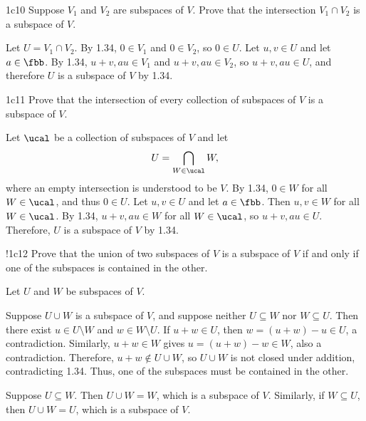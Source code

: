 \begin{exercise}{1c10}
    Suppose $V_1$ and $V_2$ are subspaces of $V$.
	Prove that the intersection $V_1 \cap V_2$ is a subspace of $V$.
\end{exercise}

\begin{sol}
    Let $U = V_1 \cap V_2$.
	By 1.34, $0 \in V_1$ and $0 \in V_2$, so $0 \in U$.
    Let $u, v \in U$ and let $a \in \fbb$.
    By 1.34, $u + v, au \in V_1$ and $u + v, au \in V_2$, so $u + v, au \in U$, and therefore $U$ is a subspace of $V$ by 1.34.
\end{sol}

\begin{exercise}{1c11}
    Prove that the intersection of every collection of subspaces of $V$ is a subspace of $V$.
\end{exercise}

\begin{sol}
    Let $\ucal$ be a collection of subspaces of $V$ and let
    \[
        U = \bigcap_{W \in \ucal} W,
    \]
    where an empty intersection is understood to be $V$.
    By 1.34, $0 \in W$ for all $W \in \ucal$, and thus $0 \in U$.
    Let $u, v \in U$ and let $a \in \fbb$.
    Then $u, v \in W$ for all $W \in \ucal$.
    By 1.34, $u + v, au \in W$ for all $W \in \ucal$, so $u + v, au \in U$.
    Therefore, $U$ is a subspace of $V$ by 1.34.
\end{sol}

\begin{exercise}!{1c12}
    Prove that the union of two subspaces of $V$ is a subspace of $V$ if and only if one of the subspaces is contained in the other.
\end{exercise}

\begin{sol}
    Let $U$ and $W$ be subspaces of $V$.

    \rightimp Suppose $U \cup W$ is a subspace of $V$, and suppose neither $U \subseteq W$ nor $W \subseteq U$.
    Then there exist $u \in U \setminus W$ and $w \in W \setminus U$.
	If $u + w \in U$, then $w = (u + w) - u \in U$, a contradiction.
    Similarly, $u + w \in W$ gives $u = (u + w) - w \in W$, also a contradiction.
    Therefore, $u + w \notin U \cup W$, so $U \cup W$ is not closed under addition, contradicting 1.34.
    Thus, one of the subspaces must be contained in the other.

    \leftimp Suppose $U \subseteq W$.
	Then $U \cup W = W$, which is a subspace of $V$.
	Similarly, if $W \subseteq U$, then $U \cup W = U$, which is a subspace of $V$.
\end{sol}

